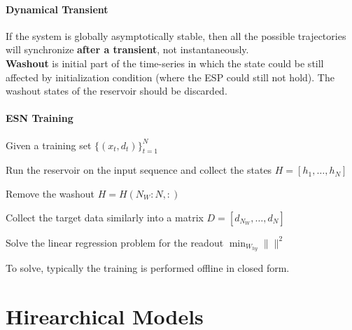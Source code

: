 \documentclass[10pt]{report}
\begin{document}
\paragraph{Dynamical Transient} If the system is globally asymptotically stable, then all the possible trajectories will synchronize \textbf{after a transient}, not instantaneously.\\
\textbf{Washout} is initial part of the time-series in which the state could be still affected by initialization condition (where the ESP could still not hold). The washout states of the reservoir should be discarded.
\paragraph{ESN Training}
\begin{list}{}{}
	\item Given a training set $\{(x_t,d_t)\}_{t=1}^N$
	\item Run the reservoir on the input sequence and collect the states $H=[h_1,\ldots,h_N]$
	\item Remove the washout $H = H(N_W:N,:)$
	\item Collect the target data similarly into a matrix $D = [d_{N_W},\ldots,d_N]$
	\item Solve the linear regression problem for the readout $\min_{W_{hy}}\| \|^2$ %
\end{list}
To solve, typically the training is performed offline in closed form.
\section{Hirearchical Models}
\end{document}
